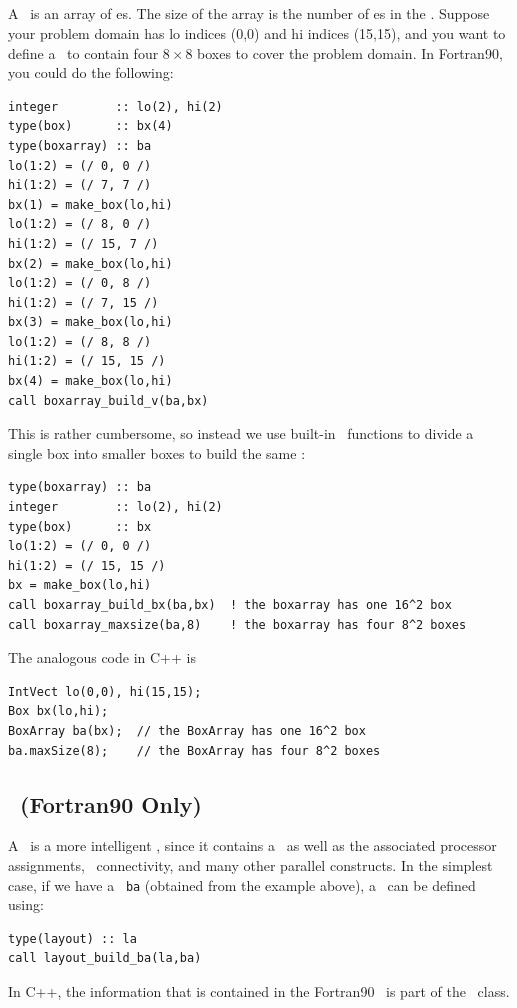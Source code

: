 \subsection{\BoxArray}

A \BoxArray\ is an array of \BoxType es.  The size of the array is the 
number of \BoxType es in the \BoxArray.  Suppose your problem domain
has lo indices (0,0) and hi indices (15,15), and you want to define
a \BoxArray\ to contain four $8\times 8$ boxes to cover the problem domain.
In Fortran90, you could do the following:
\begin{lstlisting}[backgroundcolor=\color{light-green}]
integer        :: lo(2), hi(2)
type(box)      :: bx(4)
type(boxarray) :: ba
lo(1:2) = (/ 0, 0 /)
hi(1:2) = (/ 7, 7 /)
bx(1) = make_box(lo,hi)
lo(1:2) = (/ 8, 0 /)
hi(1:2) = (/ 15, 7 /)
bx(2) = make_box(lo,hi)
lo(1:2) = (/ 0, 8 /)
hi(1:2) = (/ 7, 15 /)
bx(3) = make_box(lo,hi)
lo(1:2) = (/ 8, 8 /)
hi(1:2) = (/ 15, 15 /)
bx(4) = make_box(lo,hi)
call boxarray_build_v(ba,bx)
\end{lstlisting}
This is rather cumbersome, so instead we use built-in \BoxLib\ functions to
divide a single box into smaller boxes to build the same \BoxArray:
\begin{lstlisting}[backgroundcolor=\color{light-green}]
type(boxarray) :: ba
integer        :: lo(2), hi(2)
type(box)      :: bx
lo(1:2) = (/ 0, 0 /)
hi(1:2) = (/ 15, 15 /)
bx = make_box(lo,hi)
call boxarray_build_bx(ba,bx)  ! the boxarray has one 16^2 box
call boxarray_maxsize(ba,8)    ! the boxarray has four 8^2 boxes
\end{lstlisting}
The analogous code in C++ is
\begin{lstlisting}[backgroundcolor=\color{light-blue}]
IntVect lo(0,0), hi(15,15);
Box bx(lo,hi);
BoxArray ba(bx);  // the BoxArray has one 16^2 box
ba.maxSize(8);    // the BoxArray has four 8^2 boxes
\end{lstlisting}

\subsection{\layout\ (Fortran90 Only)}

A \layout\ is a more intelligent \BoxArray, since it contains a \BoxArray\ as well
as the associated processor assignments, \BoxType\ connectivity, and many other
parallel constructs.  In the simplest case, if we have a \BoxArray\ {\tt ba} (obtained
from the example above), a 
\layout\ can be defined using:
\begin{lstlisting}[backgroundcolor=\color{light-green}]
type(layout) :: la
call layout_build_ba(la,ba)
\end{lstlisting}
In C++, the information that is contained in the Fortran90 \layout\ is part of
the \MultiFab\ class.

